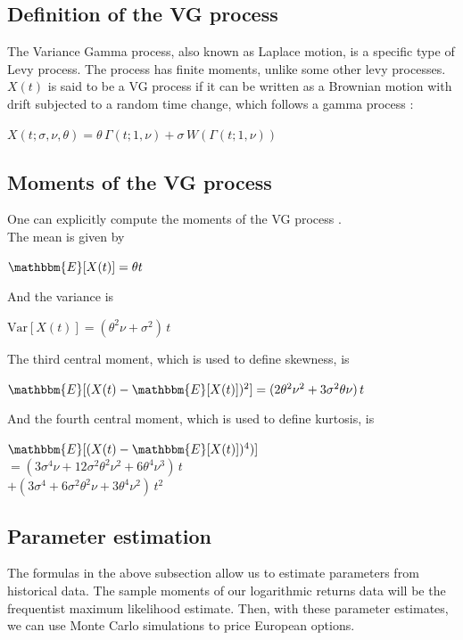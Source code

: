 \documentclass[twoside]{article}
\begin{document}
\begin{multicols}{2}
\subsection{Definition of the VG process}
The Variance Gamma process, also known as Laplace motion, is a specific type of Levy process. The process has finite moments, unlike some other levy processes. $X(t)$ is said to be a VG process if it can be written as a Brownian motion with drift subjected to a random time change, which follows a gamma process \cite{ngmbs}:
\begin{center}{
$X(t; \sigma, \nu, \theta) = \theta \, \Gamma(t; 1, \nu) + \sigma \, W(\Gamma(t; 1, \nu))$
}\end{center}

\subsection{Moments of the VG process}
One can explicitly compute the moments of the VG process \cite{fu2007variance}. \\

The mean is given by
\begin{center}{
$\mathbbm{E}[X(t)] = \theta t$ \\
}\end{center}

And the variance is
\begin{center}{
$\mathrm{Var}[X(t)] = (\theta^2 \nu + \sigma^2) \, t$ \\
}\end{center}

The third central moment, which is used to define skewness, is
\begin{center}{
$\mathbbm{E}[(X(t) - \mathbbm{E}[X(t)])^2] = (2\theta^2\nu^2 + 3 \sigma^2 \theta \nu) \, t $ \\
}\end{center}

And the fourth central moment, which is used to define kurtosis, is
\begin{center}{
$\mathbbm{E}[(X(t)-\mathbbm{E}[X(t)])^4)] $ \\ \vspace{0.5mm} $= (3\sigma^4 \nu + 12 \sigma^2 \theta^2 \nu ^ 2 + 6 \theta^4 \nu^3) \, t $ \\ $ + (3 \sigma^4 + 6 \sigma^2 \theta^2 \nu + 3 \theta^4 \nu^2) \, t^2 $ \\
}\end{center}


\subsection{Parameter estimation}
The formulas in the above subsection allow us to estimate parameters from historical data. The sample moments of our logarithmic returns data will be the frequentist maximum likelihood estimate. Then, with these parameter estimates, we can use Monte Carlo simulations to price European options. \\


\end{multicols}
\end{document}
